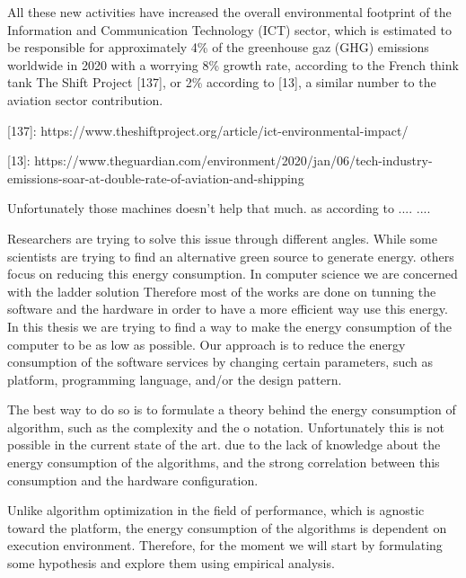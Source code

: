 All these new activities have increased the overall environmental footprint of the Information and Communication Technology (ICT) sector, which is estimated to be responsible for approximately 4\% of the greenhouse gaz (GHG) emissions worldwide in 2020 with a worrying 8\% growth rate, according to the French think tank The Shift Project [137], or 2\% according to [13], a similar number to the aviation sector contribution.

    [137]: https://www.theshiftproject.org/article/ict-environmental-impact/

[13]: https://www.theguardian.com/environment/2020/jan/06/tech-industry-emissions-soar-at-double-rate-of-aviation-and-shipping



Unfortunately those machines doesn't help that much. as according to .... ....


Researchers are trying to solve this issue through different angles.
While some scientists are trying to find an alternative green source to generate energy. others focus on reducing this energy consumption.
In computer science we are concerned with the ladder solution %
Therefore most of the works are done on tunning the software and the hardware in order to have a more efficient way use this energy. %
In this thesis we are trying to find a way to make the energy consumption of the computer to be as low as possible. %
Our approach is to reduce the energy consumption of the software services by changing certain parameters, such as platform, programming language, and/or the design pattern.

The best way to do so is to formulate a theory behind the energy consumption of algorithm, such as the complexity and the o notation.
Unfortunately this is not possible in the current state of the art. due to the lack of knowledge about the energy consumption of the algorithms, and the strong correlation between this consumption and the hardware configuration.

Unlike algorithm optimization in the field of performance, which is agnostic toward the platform, the energy consumption of the algorithms is dependent on execution environment.
Therefore, for the moment we will start by formulating some hypothesis and explore them using empirical analysis.

